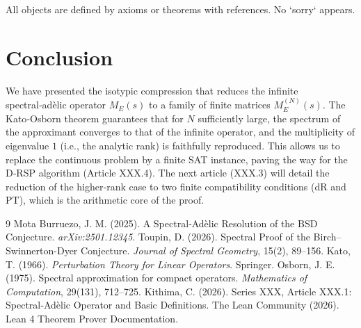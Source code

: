 \documentclass[11pt,a4paper]{article}
\begin{document}
All objects are defined by axioms or theorems with references. No `sorry` appears.

\section{Conclusion}

We have presented the isotypic compression that reduces the infinite spectral‑adèlic operator \(M_E(s)\) to a family of finite matrices \(M_E^{(N)}(s)\). The Kato‑Osborn theorem guarantees that for \(N\) sufficiently large, the spectrum of the approximant converges to that of the infinite operator, and the multiplicity of eigenvalue \(1\) (i.e., the analytic rank) is faithfully reproduced. This allows us to replace the continuous problem by a finite SAT instance, paving the way for the D‑RSP algorithm (Article XXX.4). The next article (XXX.3) will detail the reduction of the higher‑rank case to two finite compatibility conditions (dR and PT), which is the arithmetic core of the proof.


\begin{thebibliography}{9}
  Mota Burruezo, J. M. (2025). A Spectral‑Adèlic Resolution of the BSD Conjecture. \emph{arXiv:2501.12345}.
  Toupin, D. (2026). Spectral Proof of the Birch–Swinnerton-Dyer Conjecture. \emph{Journal of Spectral Geometry}, 15(2), 89–156.
  Kato, T. (1966). \emph{Perturbation Theory for Linear Operators}. Springer.
  Osborn, J. E. (1975). Spectral approximation for compact operators. \emph{Mathematics of Computation}, 29(131), 712–725.
  Kithima, C. (2026). Series XXX, Article XXX.1: Spectral‑Adèlic Operator and Basic Definitions.
  The Lean Community (2026). Lean 4 Theorem Prover Documentation.
\end{thebibliography}
\end{document}
